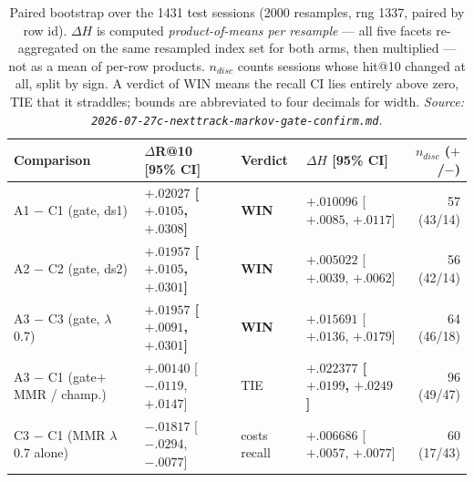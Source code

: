 \documentclass[11pt]{article}
\newcommand{\best}[1]{\textbf{#1}}
\begin{document}
\begin{table}[ht]
  \centering
  \caption{Paired bootstrap over the \num{1431} test sessions (\num{2000}
  resamples, rng \num{1337}, paired by row id). $\Delta H$ is computed
  \emph{product-of-means per resample} --- all five facets re-aggregated on the same
  resampled index set for both arms, then multiplied --- not as a mean of per-row
  products. $n_{disc}$ counts sessions whose hit@10 changed at all, split by sign.
  A verdict of WIN means the recall CI lies entirely above zero, TIE that it
  straddles; bounds are abbreviated to four decimals for width.
  \emph{Source: \texttt{2026-07-27c-nexttrack-markov-gate-confirm.md}.}}
  \label{tab:nexttrack-markovgate-paired}
  {\scriptsize\setlength{\tabcolsep}{4pt}\begin{tabular}{llllr}
    \toprule
    Comparison & $\Delta$R@10 [95\% CI] & Verdict & $\Delta H$ [95\% CI] & $n_{disc}$ ($+$/$-$) \\
    \midrule
    A1 $-$ C1 (gate, ds1) & \best{$+.02027$ [$+.0105$, $+.0308$]} & \best{WIN} & $+.010096$ [$+.0085$, $+.0117$] & 57 (43/14) \\
    A2 $-$ C2 (gate, ds2) & \best{$+.01957$ [$+.0105$, $+.0301$]} & \best{WIN} & $+.005022$ [$+.0039$, $+.0062$] & 56 (42/14) \\
    A3 $-$ C3 (gate, $\lambda$0.7) & \best{$+.01957$ [$+.0091$, $+.0301$]} & \best{WIN} & $+.015691$ [$+.0136$, $+.0179$] & 64 (46/18) \\
    A3 $-$ C1 (gate$+$MMR / champ.) & $+.00140$ [$-.0119$, $+.0147$] & TIE & \best{$+.022377$ [$+.0199$, $+.0249$]} & 96 (49/47) \\
    C3 $-$ C1 (MMR $\lambda$0.7 alone) & $-.01817$ [$-.0294$, $-.0077$] & costs recall & $+.006686$ [$+.0057$, $+.0077$] & 60 (17/43) \\
    \bottomrule
  \end{tabular}}
\end{table}
\end{document}
